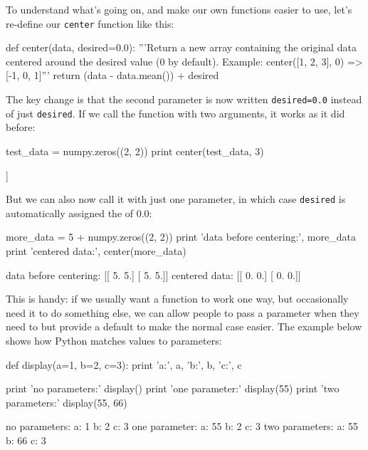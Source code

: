 \documentclass{book}
\begin{document}
To understand what's going on, and make our own functions easier to use,
let's re-define our \texttt{center} function like this:

\begin{VerbIn}
def center(data, desired=0.0):
    '''Return a new array containing the original data centered around the desired value (0 by default).
    Example: center([1, 2, 3], 0) => [-1, 0, 1]'''
    return (data - data.mean()) + desired
\end{VerbIn}

The key change is that the second parameter is now written
\texttt{desired=0.0} instead of just \texttt{desired}. If we call the
function with two arguments, it works as it did before:

\begin{VerbIn}
test_data = numpy.zeros((2, 2))
print center(test_data, 3)
\end{VerbIn}

\begin{VerbOut}
[[ 3.  3.]
 [ 3.  3.]]
\end{VerbOut}

But we can also now call it with just one parameter, in which case
\texttt{desired} is automatically assigned the
 of 0.0:

\begin{VerbIn}
more_data = 5 + numpy.zeros((2, 2))
print 'data before centering:', more_data
print 'centered data:', center(more_data)
\end{VerbIn}

\begin{VerbOut}
data before centering: [[ 5.  5.]
 [ 5.  5.]]
centered data: [[ 0.  0.]
 [ 0.  0.]]
\end{VerbOut}

This is handy: if we usually want a function to work one way, but
occasionally need it to do something else, we can allow people to pass a
parameter when they need to but provide a default to make the normal
case easier. The example below shows how Python matches values to
parameters:

\begin{VerbIn}
def display(a=1, b=2, c=3):
    print 'a:', a, 'b:', b, 'c:', c

print 'no parameters:'
display()
print 'one parameter:'
display(55)
print 'two parameters:'
display(55, 66)
\end{VerbIn}

\begin{VerbOut}
no parameters:
a: 1 b: 2 c: 3
one parameter:
a: 55 b: 2 c: 3
two parameters:
a: 55 b: 66 c: 3
\end{VerbOut}
\end{document}
